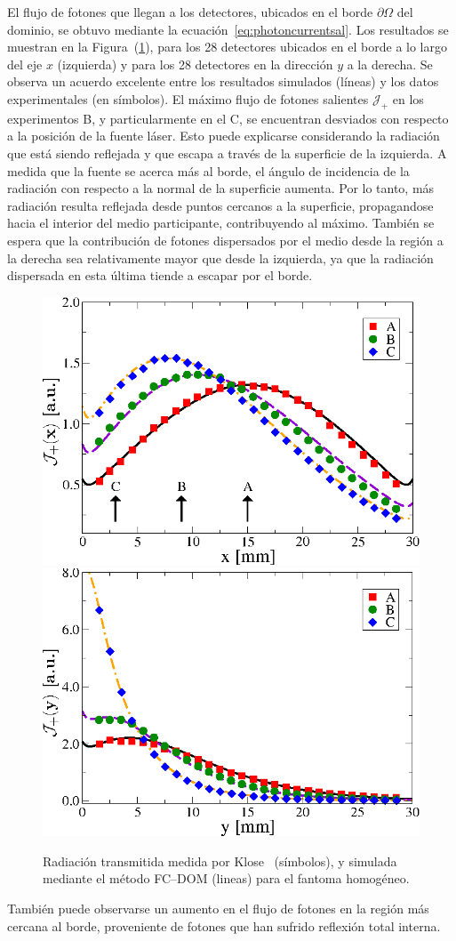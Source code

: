 El flujo de fotones que llegan a los detectores, ubicados en el borde $\partial \Omega$ 
del dominio, se obtuvo mediante la ecuación~\eqref{eq:photoncurrentsal}. 
Los resultados se muestran en la Figura~(\ref{fig:fluxph1}), 
para los 28 detectores ubicados en el borde a lo largo del eje $x$ (izquierda) 
y para los 28 detectores en la dirección $y$ a la derecha. 
Se observa un acuerdo excelente entre los resultados simulados (líneas) 
y los datos experimentales (en símbolos).  El máximo 
flujo de fotones salientes $\mathcal{J}_+$ en los experimentos B, 
y particularmente en el C, se encuentran desviados con respecto a la posición 
de la fuente láser. Esto puede explicarse considerando la radiación 
que está siendo reflejada y que escapa a través de la superficie de la izquierda. 
A medida que la fuente se acerca más al borde, el ángulo de incidencia de la 
radiación con respecto a la normal de la superficie aumenta. Por lo tanto, 
más radiación resulta reflejada desde puntos cercanos a la superficie, 
propagandose hacia el interior del medio participante, 
contribuyendo al máximo. También se espera que la contribución de fotones dispersados 
por el medio desde la región a la derecha sea relativamente mayor 
que desde la izquierda, ya que la radiación 
dispersada en esta última tiende a escapar por el borde. 
\begin{figure}[h!]
\centering
  \includegraphics[width=0.48\linewidth]{figuras/kloseph1x.eps}
  \includegraphics[width=0.48\linewidth]{figuras/ph1y.eps}
  \caption{Radiación transmitida medida por Klose~\cite{Klose2002} (símbolos), 
  y simulada mediante el método FC--DOM (lineas) para el fantoma homogéneo. }
 \label{fig:fluxph1}
\end{figure}
También puede observarse un aumento en el flujo de fotones en la región más 
cercana al borde, proveniente de fotones que han sufrido reflexión total interna.

